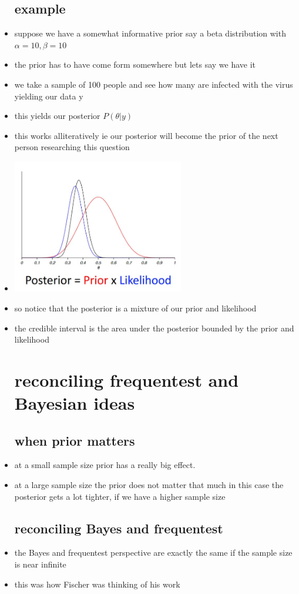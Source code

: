 \documentclass{article}
\begin{document}
\begin{itemize}
\subsection{example}
\item suppose we have a somewhat informative prior say a beta distribution with $\alpha=10, \beta=10$
\item the prior has to have come form somewhere but lets say we have it 
\item we take a sample of 100 people and see how many are infected with the virus yielding our data y
\item this yields our posterior $P(\theta|y)$
\item this works alliteratively ie our posterior will become the prior of the next person researching this question
\item
\includegraphics[width=7.5cm]{Final_Review/lecture_6/posteriro=.jpg}
\item so notice that the posterior is a mixture of our prior and likelihood 
\item the credible interval is the area under the posterior bounded by the prior and likelihood
\section{reconciling frequentest and Bayesian ideas}
\subsection{when prior matters}
\item at a small sample size prior has a really big effect.
\item at a large sample size the prior does not matter that much 
\itme in this case the posterior gets a lot tighter, if we have a higher sample size
\subsection{reconciling Bayes and frequentest}
\item the Bayes and frequentest perspective are exactly the same if the sample size is near infinite
\item this was how Fischer was thinking of his work 


\end{itemize}
\end{document}
